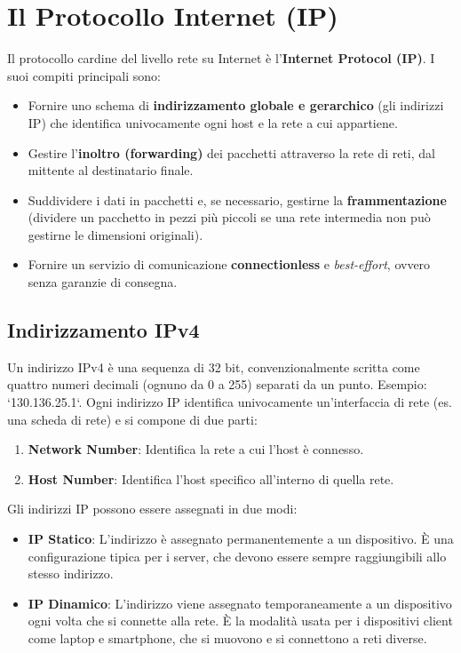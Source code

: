 \section{Il Protocollo Internet (IP)}
Il protocollo cardine del livello rete su Internet è l'\textbf{Internet Protocol (IP)}. I suoi compiti principali sono:
\begin{itemize}
    \item Fornire uno schema di \textbf{indirizzamento globale e gerarchico} (gli indirizzi IP) che identifica univocamente ogni host e la rete a cui appartiene.
    \item Gestire l'\textbf{inoltro (forwarding)} dei pacchetti attraverso la rete di reti, dal mittente al destinatario finale.
    \item Suddividere i dati in pacchetti e, se necessario, gestirne la \textbf{frammentazione} (dividere un pacchetto in pezzi più piccoli se una rete intermedia non può gestirne le dimensioni originali).
    \item Fornire un servizio di comunicazione \textbf{connectionless} e \textit{best-effort}, ovvero senza garanzie di consegna.
\end{itemize}


\subsection{Indirizzamento IPv4}
Un indirizzo IPv4 è una sequenza di 32 bit, convenzionalmente scritta come quattro numeri decimali (ognuno da 0 a 255) separati da un punto. Esempio: `130.136.25.1`.
Ogni indirizzo IP identifica univocamente un'interfaccia di rete (es. una scheda di rete) e si compone di due parti:
\begin{enumerate}
    \item \textbf{Network Number}: Identifica la rete a cui l'host è connesso.
    \item \textbf{Host Number}: Identifica l'host specifico all'interno di quella rete.
\end{enumerate}
Gli indirizzi IP possono essere assegnati in due modi:
\begin{itemize}
    \item \textbf{IP Statico}: L'indirizzo è assegnato permanentemente a un dispositivo. È una configurazione tipica per i server, che devono essere sempre raggiungibili allo stesso indirizzo.
    \item \textbf{IP Dinamico}: L'indirizzo viene assegnato temporaneamente a un dispositivo ogni volta che si connette alla rete. È la modalità usata per i dispositivi client come laptop e smartphone, che si muovono e si connettono a reti diverse.
\end{itemize}

